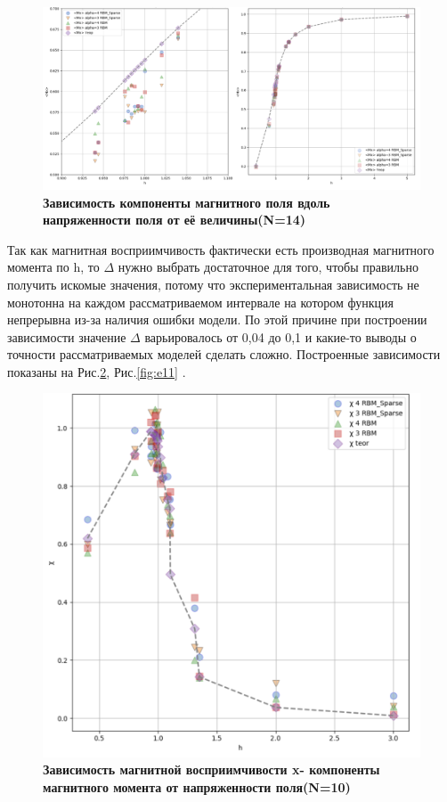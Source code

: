 \begin{figure}[H]
    \centering
    \includegraphics[width=1\linewidth]{Course_work/Images/MM-N-14.png}
    \caption{\textbf{Зависимость компоненты магнитного поля вдоль напряженности поля от её величины(N=14)}}
    \label{fig:e9}
\end{figure}

Так как магнитная восприимчивость фактически есть производная магнитного момента по h, то \({\Delta} \) нужно выбрать достаточное для того, чтобы правильно получить искомые значения, потому что экспериментальная зависимость не монотонна на каждом рассматриваемом интервале на котором функция непрерывна из-за наличия ошибки модели. По этой причине  при построении зависимости значение \({\Delta} \)  варьировалось от 0,04 до 0,1 и какие-то выводы о точности рассматриваемых моделей сделать сложно. Построенные зависимости показаны на Рис.\ref{fig:e10}, Рис.\ref{fig:e11} .

\begin{figure}[H]
    \centering
    \includegraphics[width=1\linewidth]{Course_work/Images/MV-N-10.png}
    \caption{\textbf{Зависимость магнитной восприимчивости x- компоненты магнитного момента  от напряженности поля(N=10)}}
    \label{fig:e10}
\end{figure}



